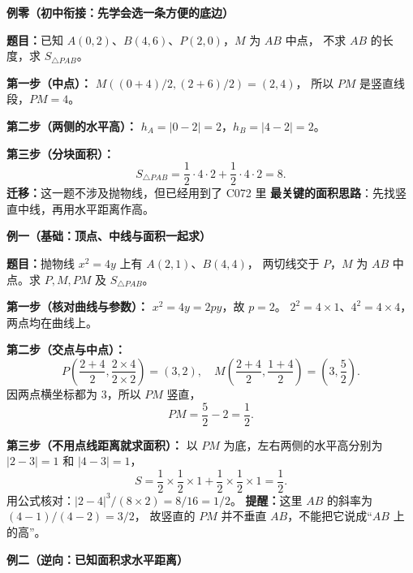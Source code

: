 \begin{examplebox}

    \textbf{\textcolor{CExample}{例零（初中衔接：先学会选一条方便的底边）}}

    \textbf{题目：}已知 $A(0,2)$、$B(4,6)$、$P(2,0)$，$M$ 为 $AB$ 中点，
    不求 $AB$ 的长度，求 $S_{\triangle PAB}$。

    

    \textbf{第一步（中点）：}
    $M\left((0+4)/2,(2+6)/2\right)=(2,4)$，
    所以 $PM$ 是竖直线段，$PM=4$。

    \textbf{第二步（两侧的水平高）：}
    $h_A=|0-2|=2$，$h_B=|4-2|=2$。

    \textbf{第三步（分块面积）：}
    \[
       S_{\triangle PAB}
       =\frac12\cdot4\cdot2+\frac12\cdot4\cdot2
       =\boxed{8}.
    \]
    \textbf{迁移：}这一题不涉及抛物线，但已经用到了 C072 里
    \textbf{最关键的面积思路}：先找竖直中线，再用水平距离作高。

    \medskip

    \par\noindent\begin{minipage}{\linewidth}
    \textbf{\textcolor{CExample}{例一（基础：顶点、中线与面积一起求）}}

    \textbf{题目：}抛物线 $x^2=4y$ 上有 $A(2,1)$、$B(4,4)$，
    两切线交于 $P$，$M$ 为 $AB$ 中点。求 $P,M,PM$ 及 $S_{\triangle PAB}$。

    \end{minipage}\par
    \textbf{第一步（核对曲线与参数）：} $x^2=4y=2py$，故 $p=2$。
    $2^2=4\times1$、$4^2=4\times4$，两点均在曲线上。

    \textbf{第二步（交点与中点）：}
    \[
        P\left(\frac{2+4}{2},\frac{2\times4}{2\times2}\right)=(3,2),
        \quad M\left(\frac{2+4}{2},\frac{1+4}{2}\right)
        =\left(3,\frac52\right).
    \]
    因两点横坐标都为 $3$，所以 $PM$ 竖直，
    \[
        PM=\frac52-2=\frac12.
    \]

    \textbf{第三步（不用点线距离就求面积）：}
    以 $PM$ 为底，左右两侧的水平高分别为 $|2-3|=1$ 和 $|4-3|=1$，
    \[
        S=\frac12\times\frac12\times1
          +\frac12\times\frac12\times1=\boxed{\frac12}.
    \]
    用公式核对：$|2-4|^3/(8\times2)=8/16=1/2$。
    \textbf{提醒：}这里 $AB$ 的斜率为 $(4-1)/(4-2)=3/2$，
    故竖直的 $PM$ 并不垂直 $AB$，不能把它说成“$AB$ 上的高”。

    \medskip
    \textbf{\textcolor{CExample}{例二（逆向：已知面积求水平距离）}}


\end{examplebox}
